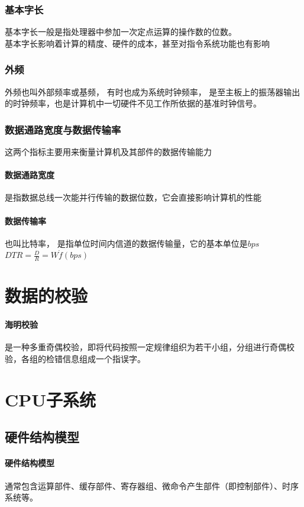 \documentclass[a4paper, 12pt, oneside]{ctexart}
\begin{document}
	\subsubsection{基本字长}
	基本字长一般是指处理器中参加一次定点运算的操作数的位数。\\
	基本字长影响着计算的精度、硬件的成本，甚至对指令系统功能也有影响
	\subsubsection{外频}
	外频也叫外部频率或基频， 有时也成为系统时钟频率， 是至主板上的振荡器输出的时钟频率，也是计算机中一切硬件不见工作所依据的基准时钟信号。
	\subsubsection{数据通路宽度与数据传输率}
	这两个指标主要用来衡量计算机及其部件的数据传输能力
	\paragraph{数据通路宽度}
	是指数据总线一次能并行传输的数据位数，它会直接影响计算机的性能
	\paragraph{数据传输率}
	也叫比特率， 是指单位时间内信道的数据传输量，它的基本单位是$bps$\\
		$DTR = \frac{D}{R} = W \dot f(bps) $
	
	\section{数据的校验}
	\paragraph{海明校验}
	是一种多重奇偶校验，即将代码按照一定规律组织为若干小组，分组进行奇偶校验，各组的检错信息组成一个指误字。
		
	\section{CPU子系统}
	\subsection{硬件结构模型}
	\paragraph{硬件结构模型}
	通常包含运算部件、缓存部件、寄存器组、微命令产生部件（即控制部件）、时序系统等。
\end{document}
